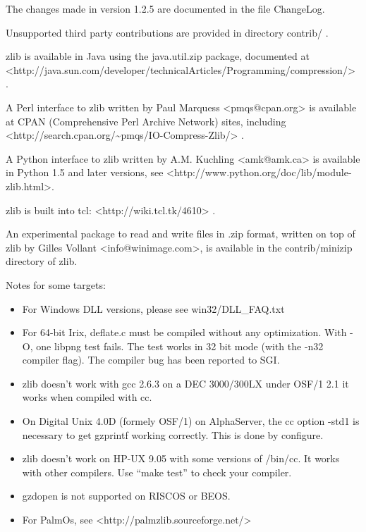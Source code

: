 The changes made in version 1.2.5 are documented in the file ChangeLog.

Unsupported third party contributions are provided in directory contrib/ .

zlib is available in Java using the java.util.zip package, documented at \textless{}http://java.sun.com/developer/technicalArticles/Programming/compression/\textgreater{} .

A Perl interface to zlib written by Paul Marquess \textless{}pmqs@cpan.org\textgreater{} is available at CPAN (Comprehensive Perl Archive Network) sites, including \textless{}http://search.cpan.org/\textasciitilde{}pmqs/IO-Compress-Zlib/\textgreater{} .

A Python interface to zlib written by A.M. Kuchling \textless{}amk@amk.ca\textgreater{} is available in Python 1.5 and later versions, see \textless{}http://www.python.org/doc/lib/module-zlib.html\textgreater{}.

zlib is built into tcl: \textless{}http://wiki.tcl.tk/4610\textgreater{} .

An experimental package to read and write files in .zip format, written on top of zlib by Gilles Vollant \textless{}info@winimage.com\textgreater{}, is available in the contrib/minizip directory of zlib.

Notes for some targets:

\begin{itemize}
\item
  For Windows DLL versions, please see win32/DLL\_FAQ.txt
\item
  For 64-bit Irix, deflate.c must be compiled without any optimization. With -O, one libpng test fails. The test works in 32 bit mode (with the -n32~~ compiler flag). The compiler bug has been reported to SGI.
\item
  zlib doesn't work with gcc 2.6.3 on a DEC 3000/300LX under OSF/1 2.1 it works when compiled with cc.
\item
  On Digital Unix 4.0D (formely OSF/1) on AlphaServer, the cc option -std1 is necessary to get gzprintf working correctly. This is done by configure.
\item
  zlib doesn't work on HP-UX 9.05 with some versions of /bin/cc. It works with other compilers. Use ``make test'' to check your compiler.
\item
  gzdopen is not supported on RISCOS or BEOS.
\item
  For PalmOs, see \textless{}http://palmzlib.sourceforge.net/\textgreater{}
\end{itemize}

